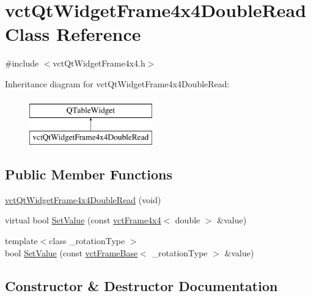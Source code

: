 \hypertarget{classvct_qt_widget_frame4x4_double_read}{}\section{vct\+Qt\+Widget\+Frame4x4\+Double\+Read Class Reference}
\label{classvct_qt_widget_frame4x4_double_read}


{\ttfamily \#include $<$vct\+Qt\+Widget\+Frame4x4.\+h$>$}

Inheritance diagram for vct\+Qt\+Widget\+Frame4x4\+Double\+Read\+:\begin{figure}[H]
\begin{center}
\leavevmode
\includegraphics[height=2.000000cm]{d4/d48/classvct_qt_widget_frame4x4_double_read}
\end{center}
\end{figure}
\subsection*{Public Member Functions}
\begin{DoxyCompactItemize}
\item 
\hyperlink{classvct_qt_widget_frame4x4_double_read_ac62bc44c4128c7a94d0f8d31f8fa711e}{vct\+Qt\+Widget\+Frame4x4\+Double\+Read} (void)
\item 
virtual bool \hyperlink{classvct_qt_widget_frame4x4_double_read_a48cba6a455800a96f440ebe6e7a73b40}{Set\+Value} (const \hyperlink{classvct_frame4x4}{vct\+Frame4x4}$<$ double $>$ \&value)
\item 
{\footnotesize template$<$class \+\_\+rotation\+Type $>$ }\\bool \hyperlink{classvct_qt_widget_frame4x4_double_read_ab9b153aa03ec8be4489b18d2399ffadf}{Set\+Value} (const \hyperlink{classvct_frame_base}{vct\+Frame\+Base}$<$ \+\_\+rotation\+Type $>$ \&value)
\end{DoxyCompactItemize}


\subsection{Constructor \& Destructor Documentation}
\hypertarget{classvct_qt_widget_frame4x4_double_read_ac62bc44c4128c7a94d0f8d31f8fa711e}{}
